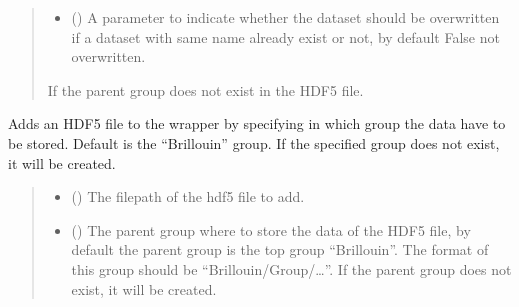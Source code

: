\documentclass[letterpaper,10pt,english]{sphinxmanual}
\begin{document}
\begin{fulllineitems}
\begin{fulllineitems}
\begin{quote}
\begin{description}
\begin{itemize}
\item {} 
\sphinxAtStartPar
{} (\sphinxstyleliteralemphasis{\sphinxupquote{, }}) \textendash{} A parameter to indicate whether the dataset should be overwritten if a dataset with same name already exist or not, by default False \sphinxhyphen{} not overwritten.

\end{itemize}

\sphinxAtStartPar
{} \textendash{} If the parent group does not exist in the HDF5 file.

\end{description}\end{quote}

\end{fulllineitems}


\begin{fulllineitems}
\label{\detokenize{_autosummary/HDF5_BLS.wrapper:HDF5_BLS.wrapper.Wrapper.add_hdf5}}
\pysigstartsignatures
\pysiglinewithargsret
{}
{\sphinxparamcomma {}\sphinxparamcomma {}}
{}
\pysigstopsignatures
\sphinxAtStartPar
Adds an HDF5 file to the wrapper by specifying in which group the data have to be stored. Default is the “Brillouin” group. If the specified group does not exist, it will be created.
\begin{quote}\begin{description}
\begin{itemize}
\item {} 
\sphinxAtStartPar
{} () \textendash{} The filepath of the hdf5 file to add.

\item {} 
\sphinxAtStartPar
{} (\sphinxstyleliteralemphasis{\sphinxupquote{, }}) \textendash{} The parent group where to store the data of the HDF5 file, by default the parent group is the top group “Brillouin”. The format of this group should be “Brillouin/Group/…”. If the parent group does not exist, it will be created.


\end{itemize}
\end{description}
\end{quote}
\end{fulllineitems}
\end{fulllineitems}
\end{document}
